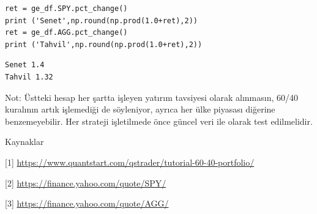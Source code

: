 \documentclass[12pt,fleqn]{article}\usepackage{../../common}
\begin{document}
\begin{verbatim}
ret = ge_df.SPY.pct_change()
print ('Senet',np.round(np.prod(1.0+ret),2))
ret = ge_df.AGG.pct_change()
print ('Tahvil',np.round(np.prod(1.0+ret),2))
\end{verbatim}

\begin{verbatim}
Senet 1.4
Tahvil 1.32
\end{verbatim}

Not: Üstteki hesap her şartta işleyen yatırım tavsiyesi olarak alınmasın, 60/40
kuralının artık işlemediği de söyleniyor, ayrıca her ülke piyasası diğerine
benzemeyebilir. Her strateji işletilmede önce güncel veri ile olarak test
edilmelidir.

Kaynaklar

[1] \url{https://www.quantstart.com/qstrader/tutorial-60-40-portfolio/}

[2] \url{https://finance.yahoo.com/quote/SPY/}

[3] \url{https://finance.yahoo.com/quote/AGG/}
  
\end{document}
